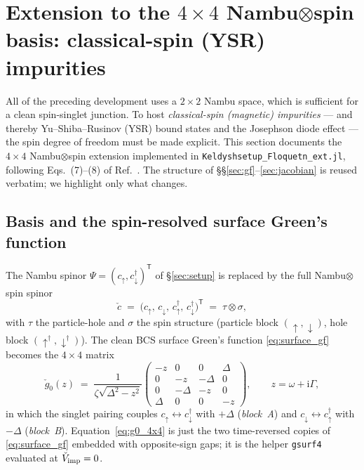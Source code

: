 \documentclass[11pt,a4paper]{article}
\newcommand{\ii}{\mathrm{i}}
\begin{document}
\section{Extension to the \texorpdfstring{$4\times4$}{4x4} Nambu\texorpdfstring{$\otimes$}{x}spin basis: classical-spin (YSR) impurities}
\label{sec:ysr}

All of the preceding development uses a $2\times2$ Nambu space, which is
sufficient for a clean spin-singlet junction.  To host \emph{classical-spin
(magnetic) impurities} --- and thereby Yu--Shiba--Rusinov (YSR) bound states and
the Josephson diode effect --- the spin degree of freedom must be made explicit.
This section documents the $4\times4$ Nambu$\otimes$spin extension implemented in
\texttt{Keldyshsetup\_Floquetn\_ext.jl}, following Eqs.~(7)--(8) of
Ref.~\cite{Lahiri2026YSR}.  The structure of
\S\S\ref{sec:gf}--\ref{sec:jacobian} is reused verbatim; we highlight only what
changes.

\subsection{Basis and the spin-resolved surface Green's function}
\label{sec:ysr_basis}

The Nambu spinor $\Psi=(c_\uparrow,c^\dagger_\downarrow)^{\mathsf T}$ of
\S\ref{sec:setup} is replaced by the full Nambu$\otimes$spin spinor
\begin{equation}
  \check c \;=\; \big(c_\uparrow,\,c_\downarrow,\,c^\dagger_\uparrow,\,c^\dagger_\downarrow\big)^{\mathsf T}
  \;=\;\tau\otimes\sigma,
\end{equation}
with $\tau$ the particle-hole and $\sigma$ the spin structure (particle block
$(\uparrow,\downarrow)$, hole block $(\uparrow^\dagger,\downarrow^\dagger)$).  The
clean BCS surface Green's function \eqref{eq:surface_gf} becomes the $4\times4$
matrix
\begin{equation}
  \check g_0(z) \;=\; \frac{1}{\zeta\sqrt{\Delta^2-z^2}}
  \begin{pmatrix}
    -z & 0 & 0 & \Delta\\
    0 & -z & -\Delta & 0\\
    0 & -\Delta & -z & 0\\
    \Delta & 0 & 0 & -z
  \end{pmatrix},
  \qquad z=\omega+\ii\Gamma,
  \label{eq:g0_4x4}
\end{equation}
in which the singlet pairing couples $c_\uparrow\!\leftrightarrow\!c^\dagger_\downarrow$
with $+\Delta$ (\emph{block~A}) and $c_\downarrow\!\leftrightarrow\!c^\dagger_\uparrow$
with $-\Delta$ (\emph{block~B}).  Equation~\eqref{eq:g0_4x4} is just the two
time-reversed copies of \eqref{eq:surface_gf} embedded with opposite-sign gaps;
it is the helper \texttt{gsurf4} evaluated at $\check V_{\rm imp}=0$.
\end{document}
